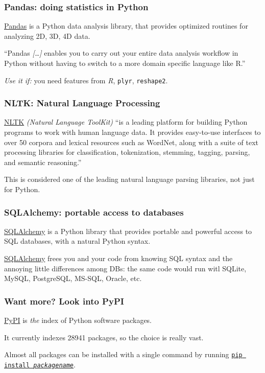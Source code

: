 \documentclass[english,serif,mathserif,xcolor=pdftex,dvipsnames,table]{beamer}
\begin{document}
\begin{frame}
  \frametitle{Pandas: doing statistics in Python}

  \href{http://pandas.pydata.org/}{Pandas} is a Python data analysis
  library, that provides optimized routines for analyzing 2D, 3D, 4D
  data.

  \+ ``Pandas \emph{[\ldots]} enables you to carry out your entire
  data analysis workflow in Python without having to switch to a more
  domain specific language like R.''

  \+ \emph{Use it if:} you need features from \emph{R}, \texttt{plyr},
  \texttt{reshape2}.
\end{frame}


\begin{frame}
  \frametitle{NLTK: Natural Language Processing}

  \href{http://nltk.org/}{NLTK} \emph{(Natural Language ToolKit)} ``is
  a leading platform for building Python programs to work with human
  language data. It provides easy-to-use interfaces to over 50 corpora
  and lexical resources such as WordNet, along with a suite of text
  processing libraries for classification, tokenization, stemming,
  tagging, parsing, and semantic reasoning.''

  \+ This is considered one of the leading natural language parsing
  libraries, not just for Python.
\end{frame}


\begin{frame}
  \frametitle{SQLAlchemy: portable access to databases}

  \href{http://www.sqlalchemy.org/}{SQLAlchemy} is a Python library
  that provides portable and powerful access to SQL databases, with a
  natural Python syntax.

  \+ \href{http://www.sqlalchemy.org/}{SQLAlchemy} frees you and your
  code from knowing SQL syntax and the annoying little differences
  among DBs: the same code would run witl SQLite, MySQL, PostgreSQL,
  MS-SQL, Oracle, etc.
\end{frame}


\begin{frame}
  \frametitle{Want more? Look into PyPI}

  \href{http://pypi.python.org}{PyPI} is \emph{the} index of Python software packages.

  \+ It currently indexes 28941 packages, so the choice is really vast.

  \+ Almost all packages can be installed with a single command by
  running \href{https://pypi.python.org/pypi/pip}{\texttt{pip install
    \emph{packagename}}}.

\end{frame}
\end{document}
